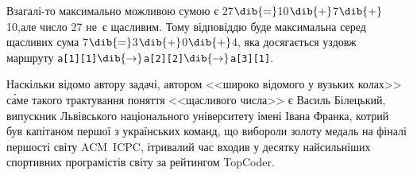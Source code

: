 
\Notes
Взагалі-то максимально можливою сумою є 27$\dib{{=}}$10$\dib{{+}}$7$\dib{{+}}$10,\linebreak[2] але число 27 не~є щасливим.
Тому відповіддю буде максимальна серед щасливих сума 7$\dib{{=}}$3$\dib{{+}}$0$\dib{{+}}$4, 
яка досягається уздовж маршруту \texttt{a[1][1]}$\dib{{\to}}$\texttt{a[2][2]}$\dib{{\to}}$\texttt{a[3][1]}.

Наскільки відомо автору задачі, автором <<широко відомого у вузьких колах>> с\'{а}ме такого трактування поняття <<щасливого числа>>
є Василь Білецький, випускник Львівського національного університету імені Івана Франка,
котрий був капітаном першої з українських команд, що вибороли золоту медаль на фіналі першості світу ACM~ICPC,
і\nolinebreak[3] тривалий час входив у десятку найсильніших спортивних програмістів світу за рейтингом TopCoder.

